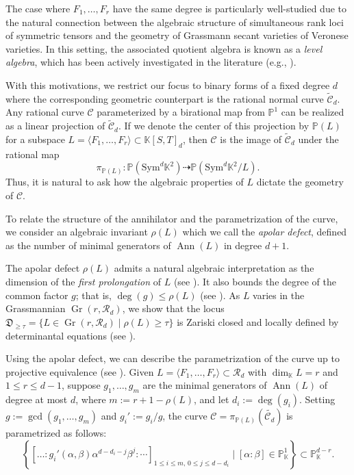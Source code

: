 \documentclass[a4paper, 11pt]{amsart}
\numberwithin{theorem}{section}
\theoremstyle{definition}
\numberwithin{equation}{section}
\DeclareMathOperator{\Ann}{\operatorname{Ann}}
\newcommand{\Gr}{\operatorname{Gr}}
\begin{document}
The case where $F_1,\dots, F_r$ have the same degree is particularly well-studied due to the natural connection between the algebraic structure of simultaneous rank loci of symmetric tensors and the geometry of Grassmann secant varieties of Veronese varieties.
In this setting, the associated quotient algebra is known as a \emph{level algebra}, which has been actively investigated in the literature (e.g., \cite{MR3592466,MR2028071}).

With this motivations, we restrict our focus to binary forms of a fixed degree $d$ where the corresponding geometric counterpart is the rational normal curve $\widetilde{\mathcal{C}}_d$.
Any rational curve $\mathcal{C}$ parameterized by a birational map from $\mathbb{P}^1$ can be realized as a linear projection of $\widetilde{\mathcal{C}}_d$.
If we denote the center of this projection by $\mathbb{P}(L)$ for a subspace $L = \langle F_1,\dots, F_r \rangle \subset \mathbb{K}[S,T]_d$, then $\mathcal{C}$ is the image of $\widetilde{\mathcal{C}}_d$ under the rational map 
\[
\pi_{\mathbb{P}(L)}:\mathbb{P}(\mathrm{Sym}^d\mathbb{K}^2) \dashrightarrow \mathbb{P}(\mathrm{Sym}^d\mathbb{K}^2/L).
\]
Thus, it is natural to ask how the algebraic properties of $L$ dictate the geometry of $\mathcal{C}$.

To relate the structure of the annihilator and the parametrization of the curve, we consider an algebraic invariant $\rho(L)$ which we call the \emph{apolar defect}, defined as the number of minimal generators of $\Ann(L)$ in degree $d+1$.

The apolar defect $\rho(L)$ admits a natural algebraic interpretation as the dimension of the \emph{first prolongation} of $L$ (see ).
It also bounds the degree of the common factor $g$; that is, $\deg(g)\leq\rho(L)$ (see ).
As $L$ varies in the Grassmannian $\Gr(r,\mathcal{R}_d)$, we show that the locus $\mathfrak D_{\ge\tau}=\{L\in\Gr(r,\mathcal{R}_d)\mid\rho(L)\geq\tau\}$ is Zariski closed and locally defined by determinantal equations (see ).

Using the apolar defect, we can describe the parametrization of the curve up to projective equivalence (see ).
Given $L = \langle F_1,\dots,F_r \rangle \subset \mathcal{R}_d$ with $\dim_{\mathbb{K}}L = r$ and $1\leq r \leq d-1$, suppose $g_1, \dots, g_{m}$ are the minimal generators of $\Ann(L)$ of degree at most $d$, where $m := r+1-\rho(L)$, and let $d_i := \deg(g_i)$.
Setting $g := \gcd(g_1, \dots, g_{m})$ and $g_i' := g_i/g$, the curve $\mathcal{C} = \pi_{\mathbb{P}(L)} (\widetilde{\mathcal{C}_d})$ is parametrized as follows:
\begin{equation}\label{equ:parametrizationCurve}
\left\{ \left[ \dots : g_i'(\alpha,\beta)\alpha^{d-d_i-j}\beta^{j} : \cdots \right]_{1 \le i \le m, \, 0 \le j \le d-d_i} \mid [\alpha:\beta] \in \mathbb{P}_{\mathbb{K}}^1 \right\} \subset \mathbb{P}^{d-r}_{\mathbb{K}}.
\end{equation}
\end{document}
